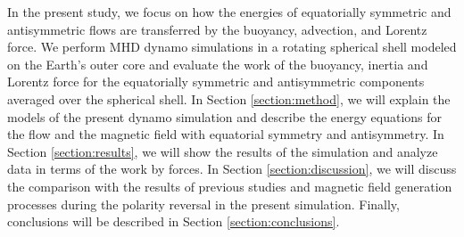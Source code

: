 In the present study, we focus on how the energies of equatorially symmetric and antisymmetric flows are transferred by the buoyancy, advection, and Lorentz force. 
We perform MHD dynamo simulations in a rotating spherical shell modeled on the Earth's outer core and evaluate the work of the buoyancy, inertia %
and Lorentz force for the equatorially symmetric and antisymmetric components averaged over the spherical shell. 
In Section \ref{section:method}, we will explain the models of the present dynamo simulation and describe the energy equations %
{\color{teal}
for the flow and the magnetic field with equatorial symmetry and antisymmetry.
}
In Section \ref{section:results}, we will show the results of the simulation and analyze data in terms of the work by forces. 
In Section \ref{section:discussion}, we will discuss the comparison with the results of previous studies and magnetic field generation processes during the polarity reversal in the present simulation. 
Finally, conclusions will be described in Section \ref{section:conclusions}.
